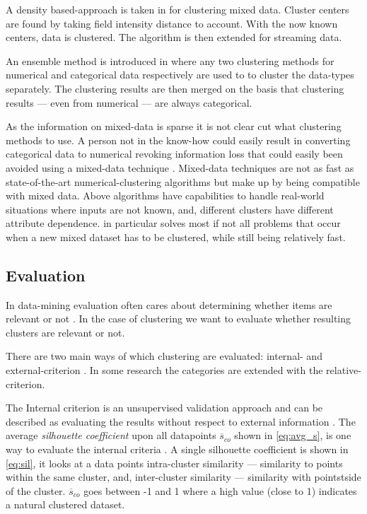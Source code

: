 \documentclass[a4paper,11pt]{article}
\begin{document}
A density based-approach is taken in \cite{CHEN2016271} for clustering mixed data. Cluster centers are found by taking field intensity distance to account. With the now known centers, data is clustered. The algorithm is then extended for streaming data.

An ensemble method is introduced in \cite{DBLP:journals/corr/abs-cs-0509011} where any two clustering methods for numerical and categorical data respectively are used to to cluster the data-types separately. The clustering results are then merged on the basis that clustering results --- even from numerical --- are always categorical.

As the information on mixed-data is sparse it is not clear cut what clustering methods to use. A person not in the know-how could easily result in converting categorical data to numerical revoking information loss that could easily been avoided using a mixed-data technique \cite{Kaufman1990}. Mixed-data techniques are not as fast as state-of-the-art numerical-clustering algorithms but make up by being compatible with mixed data. Above algorithms have capabilities to handle real-world situations where inputs are not known, and, different clusters have different attribute dependence. \textcite{Jia2018} in particular solves most if not all problems that occur when a new mixed dataset has to be clustered, while still being relatively fast.

\subsection{Evaluation}
In data-mining evaluation often cares about determining whether items are relevant or not \cite{manning2010introduction}. In the case of clustering we want to evaluate whether resulting clusters are relevant or not.

There are two main ways of which clustering are evaluated: internal- and external-criterion \cite{manning2010introduction}
. In some research the categories are extended with the relative-criterion.\cite{Halkidi2002}

The Internal criterion is an unsupervised validation approach and can be described as evaluating the results without respect to external information \cite{Halkidi2002}. The average \textit{silhouette coefficient} upon all datapoints $\overline{s}_{co}$ shown in \ref{eq:avg_s}, is one way to evaluate the internal criteria \cite{ROUSSEEUW198753}. A single silhouette coefficient is shown in \ref{eq:sil}, it looks at a data points intra-cluster similarity --- similarity to points within the same cluster, and, inter-cluster similarity --- similarity with pointstside of the cluster. $\overline{s}_{co}$ goes between -1 and 1 where a high value (close to 1) indicates a natural clustered dataset.
\end{document}
